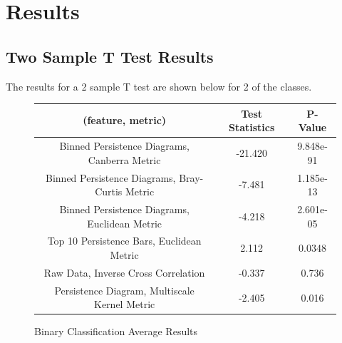 \documentclass[12pt]{article}
\begin{document}
\section{Results}
\subsection{Two Sample T Test Results}
\-\hspace{1cm} The results for a 2 sample T test are shown below for 2 of the
classes.
\begin{figure}[!ht]
\begin{center}
\begin{tabular}{||c|c|c||}
\hline
(feature, metric) & Test Statistics & P-Value \\ 
\hline 
Binned Persistence Diagrams, Canberra Metric & -21.420 & 9.848e-91 \\ 
\hline
Binned Persistence Diagrams, Bray-Curtis Metric & -7.481 & 1.185e-13 \\
\hline 
Binned Persistence Diagrams, Euclidean Metric & -4.218 & 2.601e-05 \\ 
\hline
Top 10 Persistence Bars, Euclidean Metric & 2.112 & 0.0348 \\
\hline
Raw Data, Inverse Cross Correlation & -0.337 & 0.736 \\
\hline
Persistence Diagram, Multiscale Kernel Metric & -2.405 & 0.016 \\
\hline
\end{tabular}
\end{center}
\caption{Binary Classification Average Results}
\end{figure}

\newpage
\end{document}
